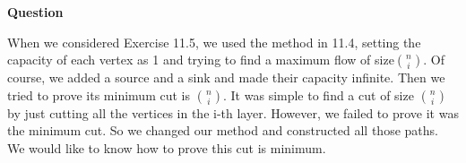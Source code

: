 \documentclass{article} %
\begin{document}
 \textbf{Question}\par
  	When we considered Exercise 11.5, we used the method in 11.4, setting the capacity of each vertex as 1 and trying to find a maximum flow of size$\binom{n}{i}$. Of course, we added a source and a sink and made their capacity infinite. Then we tried to prove its minimum cut is $\binom{n}{i}$. It was simple to find a cut of size $\binom{n}{i}$ by just cutting all the vertices in the i-th layer. However, we failed to prove it was the minimum cut. So we changed our method and constructed all those paths. We would like to know how to prove this cut is minimum.
\end{document}
